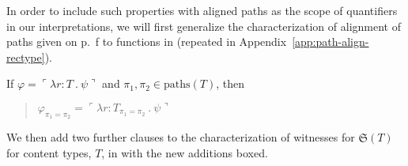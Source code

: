 In order to include such properties with aligned paths as the scope of
quantifiers in our interpretations, we will first generalize the
characterization of alignment of paths given on
p.~\pageref{pg:path-alignment-types}f to functions in \nexteg{}
(repeated in Appendix~\ref{app:path-align-rectype}).
\begin{ex} 
  If $\varphi=\ulcorner\lambda r\!:\!T\ .\ \psi\urcorner$ and
  $\pi_1,\pi_2\in\mathrm{paths}(T)$, then
  \begin{quote}
    $\varphi_{\pi_1=\pi_2}=\ulcorner\lambda r\!:\!T_{\pi_1=\pi_2}\ .\
    \psi\urcorner$
  \end{quote}
  \label{ex:path-alignment-fcts}
\end{ex} 
We then add two further clauses to the characterization of witnesses
for $\mathfrak{S}(T)$ for content types, $T$, in \nexteg{} with the
new additions boxed.
